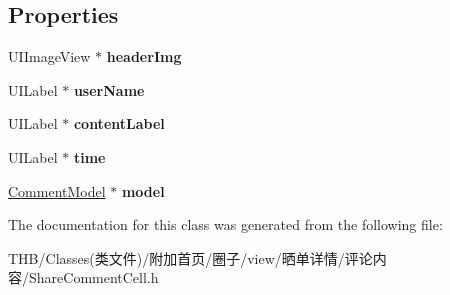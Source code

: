 \subsection*{Properties}
\begin{DoxyCompactItemize}
\item 
\mbox{\label{interface_share_comment_cell_a3f18d5f55e6146c5f6d9188c7854a9d5}} 
U\+I\+Image\+View $\ast$ {\bfseries header\+Img}
\item 
\mbox{\label{interface_share_comment_cell_aa860f2a4be16ef878a0af1d01981132c}} 
U\+I\+Label $\ast$ {\bfseries user\+Name}
\item 
\mbox{\label{interface_share_comment_cell_abfbb67c2c2e452a177dcfe45defd0efa}} 
U\+I\+Label $\ast$ {\bfseries content\+Label}
\item 
\mbox{\label{interface_share_comment_cell_acccbce9c327f36d84382a18191bd0906}} 
U\+I\+Label $\ast$ {\bfseries time}
\item 
\mbox{\label{interface_share_comment_cell_a074c96f6c14eb2634ac9f97e609bc44d}} 
\mbox{\hyperlink{interface_comment_model}{Comment\+Model}} $\ast$ {\bfseries model}
\end{DoxyCompactItemize}


The documentation for this class was generated from the following file\+:\begin{DoxyCompactItemize}
\item 
T\+H\+B/\+Classes(类文件)/附加首页/圈子/view/晒单详情/评论内容/Share\+Comment\+Cell.\+h\end{DoxyCompactItemize}
